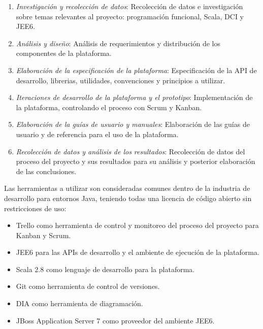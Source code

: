 \begin{enumerate}

 \item \emph{Investigaci\'on y recolecci\'on de datos}: Recolecci\'on de 
	datos e investigaci\'on sobre temas relevantes al proyecto: 
	programaci\'on funcional, Scala, \gls{DCI} y \gls{JEE6}.

 \item \emph{An\'alisis y dise\~no}: An\'alisis de requerimientos y 
	distribuci\'on de los componentes de la plataforma.
  
 \item \emph{Elaboraci\'on de la especificaci\'on de la plataforma}: 
	Especificaci\'on de la API de desarrollo, librerias, utilidades, 
	convenciones y principios a utilizar.
 
 \item \emph{Iteraciones de desarrollo de la plataforma y el prototipo}:
	Implementaci\'on de la plataforma, controlando el proceso con 
	Scrum y Kanban.
 
 \item \emph{Elaboraci\'on de la gu\'ias de usuario y manuales}: Elaboraci\'on 
	de las gu\'ias de usuario y de referencia para el uso de la plataforma.
	

 \item \emph{Recolecci\'on de datos y an\'alisis de los resultados}: Recolecci\'on 
	de datos del proceso del proyecto y sus resultados para su an\'alisis
	y posterior elaboraci\'on de las conclusiones.

\end{enumerate}

  Las herramientas a utilizar son consideradas comunes dentro de la 
  industria de desarrollo para entornos Java, teniendo todas una licencia 
  de c\'odigo abierto sin restricciones de uso:

  \begin{itemize}

   \item Trello como herramienta de control y monitoreo del proceso del proyecto 
    para Kanban y Scrum.
  
   \item \gls{JEE6} para las APIs de desarrollo y el ambiente de ejecuci\'on de la plataforma.
    
   \item Scala 2.8 como lenguaje de desarrollo para la plataforma.

   \item Git como herramienta de control de versiones.

   \item DIA como herramienta de diagramaci\'on.

   \item JBoss Application Server 7 como proveedor del ambiente JEE6.

  \end{itemize}

